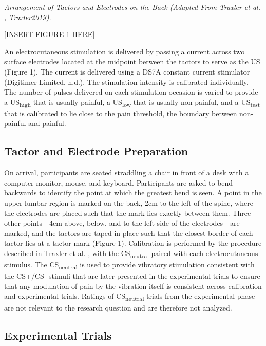 \documentclass{article}
\begin{document}
\emph{Arrangement of Tactors and Electrodes on the Back (Adapted From Traxler et al. , Traxler2019}\emph{).}

[INSERT FIGURE 1 HERE]

An electrocutaneous stimulation is delivered by passing a current across two surface electrodes located at the midpoint between the tactors to serve as the US (Figure 1). The current is delivered using a DS7A constant current stimulator \textcite{Digitimer Limited0}(Digitimer Limited, n.d.). The stimulation intensity is calibrated individually. The number of pulses delivered on each stimulation occasion is varied to provide a US\textsubscript{high} that is usually painful, a US\textsubscript{low} that is usually non-painful, and a US\textsubscript{test} that is calibrated to lie close to the pain threshold, the boundary between non-painful and painful.

\subsection{Tactor and Electrode Preparation}

On arrival, participants are seated straddling a chair in front of a desk with a computer monitor, mouse, and keyboard. Participants are asked to bend backwards to identify the point at which the greatest bend is seen. A point in the upper lumbar region is marked on the back, 2cm to the left of the spine, where the electrodes are placed such that the mark lies exactly between them. Three other points—4cm above, below, and to the left side of the electrodes—are marked, and the tactors are taped in place such that the closest border of each tactor lies at a tactor mark (Figure 1). Calibration is performed by the procedure described in Traxler et al. \textcite{Traxler2019}, with the CS\textsubscript{neutral} paired with each electrocutaneous stimulus. The CS\textsubscript{neutral} is used to provide vibratory stimulation consistent with the CS+/CS- stimuli that are later presented in the experimental trials to ensure that any modulation of pain by the vibration itself is consistent across calibration and experimental trials. Ratings of CS\textsubscript{neutral} trials from the experimental phase are not relevant to the research question and are therefore not analyzed.

\subsection{Experimental Trials}
\end{document}
